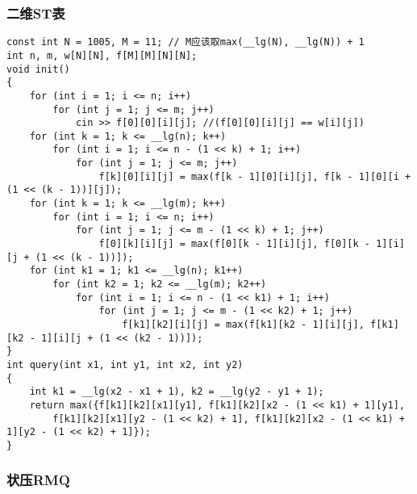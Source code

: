 \documentclass[a4paper, fontset=none]{ctexart}
\begin{document}
\subsubsection{二维ST表}
\begin{verbatim}
const int N = 1005, M = 11; // M应该取max(__lg(N), __lg(N)) + 1
int n, m, w[N][N], f[M][M][N][N];
void init()
{
    for (int i = 1; i <= n; i++)
        for (int j = 1; j <= m; j++)
            cin >> f[0][0][i][j]; //(f[0][0][i][j] == w[i][j])
    for (int k = 1; k <= __lg(n); k++)
        for (int i = 1; i <= n - (1 << k) + 1; i++)
            for (int j = 1; j <= m; j++)
                f[k][0][i][j] = max(f[k - 1][0][i][j], f[k - 1][0][i + (1 << (k - 1))][j]);
    for (int k = 1; k <= __lg(m); k++)
        for (int i = 1; i <= n; i++)
            for (int j = 1; j <= m - (1 << k) + 1; j++)
                f[0][k][i][j] = max(f[0][k - 1][i][j], f[0][k - 1][i][j + (1 << (k - 1))]);
    for (int k1 = 1; k1 <= __lg(n); k1++)
        for (int k2 = 1; k2 <= __lg(m); k2++)
            for (int i = 1; i <= n - (1 << k1) + 1; i++)
                for (int j = 1; j <= m - (1 << k2) + 1; j++)
                    f[k1][k2][i][j] = max(f[k1][k2 - 1][i][j], f[k1][k2 - 1][i][j + (1 << (k2 - 1))]);
}
int query(int x1, int y1, int x2, int y2)
{
    int k1 = __lg(x2 - x1 + 1), k2 = __lg(y2 - y1 + 1);
    return max({f[k1][k2][x1][y1], f[k1][k2][x2 - (1 << k1) + 1][y1],
        f[k1][k2][x1][y2 - (1 << k2) + 1], f[k1][k2][x2 - (1 << k1) + 1][y2 - (1 << k2) + 1]});
}
\end{verbatim}
\subsubsection{状压RMQ}
\end{document}
